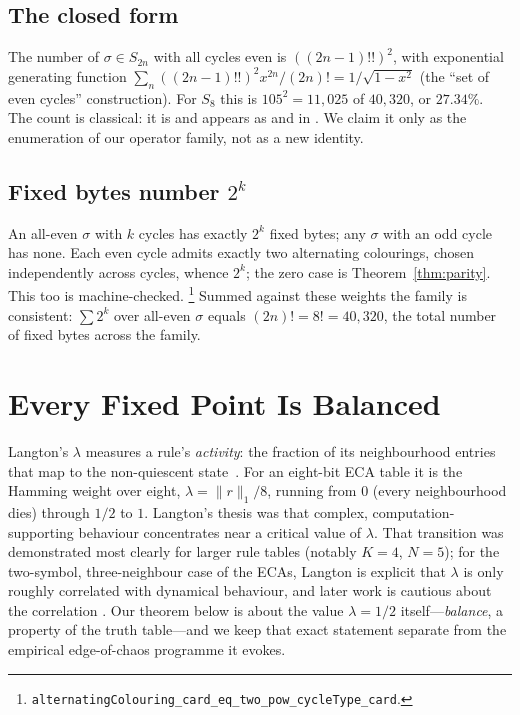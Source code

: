 \documentclass[man,12pt,floatsintext]{apa7}
\newcommand{\sig}{\sigma}
\begin{document}
\subsection{The closed form}

The number of $\sig \in S_{2n}$ with all cycles even is $((2n-1)!!)^2$, with
exponential generating function $\sum_n ((2n-1)!!)^2 x^{2n}/(2n)! =
1/\sqrt{1-x^2}$ (the ``set of even cycles'' construction).
For $S_8$ this is $105^2 = 11{,}025$ of $40{,}320$, or $27.34\%$. The count
is classical: it is \textcite{oeis_a001818} and appears as
\textcite[Problem~5.34(c)]{stanley1999enumerative} and in
\textcite{riordan1968combinatorial}. We claim it only as the enumeration of
our operator family, not as a new identity.

\subsection{Fixed bytes number $2^k$}

An all-even $\sig$ with $k$ cycles has exactly $2^k$ fixed bytes; any
$\sig$ with an odd cycle has none. Each even cycle admits exactly two
alternating colourings, chosen independently across cycles, whence $2^k$;
the zero case is Theorem~\ref{thm:parity}. This too is machine-checked.%
\footnote{\texttt{alternatingColouring\_card\_eq\_two\_pow\_cycleType\_card}.}
Summed against these weights the family is consistent:
$\sum 2^{k}$ over all-even $\sig$ equals $(2n)! = 8! = 40{,}320$, the total
number of fixed bytes across the family.

\section{Every Fixed Point Is Balanced}
\label{sec:lambda}

Langton's $\lambda$ measures a rule's \emph{activity}: the fraction of its
neighbourhood entries that map to the non-quiescent
state~\parencite{langton1990computation}. For an eight-bit ECA table it is
the Hamming weight over eight, $\lambda = \lVert r \rVert_1 / 8$, running
from $0$ (every neighbourhood dies) through $1/2$ to $1$. Langton's thesis
was that complex, computation-supporting behaviour concentrates near a
critical value of $\lambda$. That transition was demonstrated most clearly
for larger rule tables (notably $K=4$, $N=5$); for the two-symbol,
three-neighbour case of the ECAs, Langton is explicit that $\lambda$ is only
roughly correlated with dynamical behaviour, and later work is cautious about
the correlation \parencite{mitchell1993revisiting}. Our theorem below is
about the value $\lambda = 1/2$ itself---\emph{balance}, a property of the
truth table---and we keep that exact statement separate from the empirical
edge-of-chaos programme it evokes.
\end{document}
